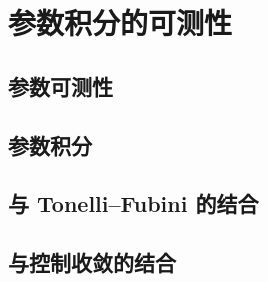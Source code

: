 \section{参数积分的可测性}
\label{b1:sec:0704}


\subsection{参数可测性}
\label{b1:subsec:070401}

\subsection{参数积分}
\label{b1:subsec:070402}

\subsection{与 Tonelli–Fubini 的结合}
\label{b1:subsec:070403}

\subsection{与控制收敛的结合}
\label{b1:subsec:070404}


